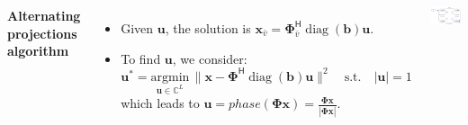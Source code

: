 \documentclass[25pt,a0paper]{tikzposter}
\newcommand{\vct}[1]{\bm{#1}} %
\newcommand{\mtx}[1]{\bm{#1}} %
\DeclareMathOperator*{\diag}{diag}
\def\C{\mathbb{C}} %
\begin{document}
\begin{columns}
{\vspace{1cm}
\textbf{Alternating projections algorithm}
\vspace{1 cm}
\begin{itemize}
    \item Given $\vct{u}$, the solution is $\vct{x}_{\bar{v}} =\mtx{\Phi}_{\bar{v}}^{\mathsf{H}}\diag(\vct{b}) \vct{u}$.
    \item To find $\vct{u}$, we consider:
    \begin{equation*}
   \vct{u}^{\ast} =  \underset{\vct{u} \in \C^{L}}{\text{argmin}}\, \|\vct{x}- \mtx{\Phi}^{\mathsf{H}}\diag(\vct{b}) \vct{u}\|^{2}   \quad \text{s.t.}  \quad  |\vct{u}| = 1 
\end{equation*}
which leads to $\vct{u} = phase (\mtx{\Phi} \vct{x}) = \displaystyle \frac{\mtx{\Phi} \vct{x}}{|\mtx{\Phi} \vct{x}|}$.
\end{itemize}


\vspace{2em}
\begin{center}
    \includegraphics[scale=1.8]{inpainting_alt_projsvg.eps}
\end{center}
}



\end{columns}
\end{document}
